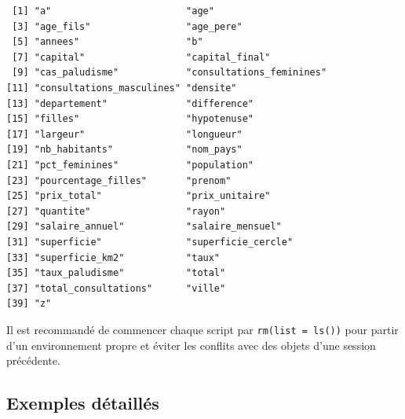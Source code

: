 \documentclass[
  french,
  11pt,
  a4paper,
]{article}
\begin{document}
\begin{verbatim}
 [1] "a"                        "age"                     
 [3] "age_fils"                 "age_pere"                
 [5] "annees"                   "b"                       
 [7] "capital"                  "capital_final"           
 [9] "cas_paludisme"            "consultations_feminines" 
[11] "consultations_masculines" "densite"                 
[13] "departement"              "difference"              
[15] "filles"                   "hypotenuse"              
[17] "largeur"                  "longueur"                
[19] "nb_habitants"             "nom_pays"                
[21] "pct_feminines"            "population"              
[23] "pourcentage_filles"       "prenom"                  
[25] "prix_total"               "prix_unitaire"           
[27] "quantite"                 "rayon"                   
[29] "salaire_annuel"           "salaire_mensuel"         
[31] "superficie"               "superficie_cercle"       
[33] "superficie_km2"           "taux"                    
[35] "taux_paludisme"           "total"                   
[37] "total_consultations"      "ville"                   
[39] "z"                       
\end{verbatim}

\begin{tcolorbox}[enhanced jigsaw, arc=.35mm, bottomrule=.15mm, bottomtitle=1mm, breakable, colback=white, colbacktitle=quarto-callout-tip-color!10!white, colframe=quarto-callout-tip-color-frame, coltitle=black, left=2mm, leftrule=.75mm, opacityback=0, opacitybacktitle=0.6, rightrule=.15mm, title=\textcolor{quarto-callout-tip-color}{\faLightbulb}\hspace{0.5em}{Bonne pratique --- Début de script}, titlerule=0mm, toprule=.15mm, toptitle=1mm]

Il est recommandé de commencer chaque script par
\texttt{rm(list\ =\ ls())} pour partir d'un environnement propre et
éviter les conflits avec des objets d'une session précédente.

\end{tcolorbox}

\subsection{Exemples détaillés}\label{exemples-duxe9tailluxe9s}
\end{document}
